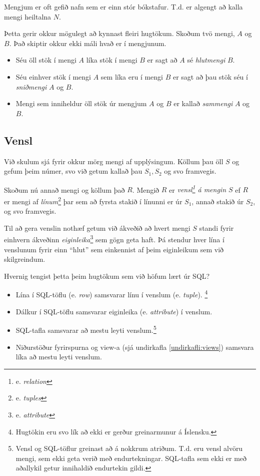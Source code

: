 Mengjum er oft gefið nafn sem er einn stór bókstafur. T.d. er algengt að kalla mengi heiltalna $N$. 

Þetta gerir okkur mögulegt að kynnast fleiri hugtökum. Skoðum tvö mengi, $A$ og $B$. Það skiptir okkur ekki máli hvað er í mengjunum.
\begin{itemize}
 \item Séu öll stök í mengi $A$ líka stök í mengi $B$ er sagt að $A$ sé \emph{hlutmengi} $B$.
 \item Séu einhver stök í mengi $A$ sem líka eru í mengi $B$ er sagt að þau stök séu í \emph{sniðmengi} $A$ og $B$.
 \item Mengi sem inniheldur öll stök úr mengjum $A$ og $B$ er kallað \emph{sammengi} $A$ og $B$.
\end{itemize}


\subsection{Vensl}
Við skulum sjá fyrir okkur mörg mengi af upplýsingum. Köllum þau öll $S$ og gefum þeim númer, svo við getum kallað þau $S_1, S_2$ og svo framvegis.

Skoðum nú annað mengi og köllum það $R$. Mengið $R$ er \emph{vensl\footnote{e. \emph{relation}} á mengin $S$} ef $R$ er mengi af \emph{línum}\footnote{e. \emph{tuples}} þar sem að fyrsta stakið í línunni er úr $S_1$, annað stakið úr $S_2$, og svo framvegis.

Til að gera venslin nothæf getum við ákveðið að hvert mengi $S$ standi fyrir einhvern ákveðinn \emph{eiginleika}\footnote{e. \emph{attribute}} sem gögn geta haft. Þá stendur hver lína í venslunum fyrir einn ``hlut'' sem einkennist af þeim eiginleikum sem við skilgreindum.

Hvernig tengist þetta þeim hugtökum sem við höfum lært úr SQL?

\begin{itemize}
 \item Lína í SQL-töflu (e. \emph{row}) samsvarar línu í venslum (e. \emph{tuple}). \footnote{Hugtökin eru svo lík að ekki er gerður greinarmunur á Íslensku.}
 \item Dálkur í SQL-töflu samsvarar eiginleika (e. \emph{attribute}) í venslum.
 \item SQL-tafla samsvarar að mestu leyti venslum.\footnote{Vensl og SQL-töflur greinast að á nokkrum atriðum. T.d. eru vensl alvöru mengi, sem ekki geta verið með endurtekningar. SQL-tafla sem ekki er með aðallykil getur innihaldið endurtekin gildi.}
 \item Niðurstöður fyrirspurna og view-a (sjá undirkafla \ref{undirkafli:views}) samsvara líka að mestu leyti venslum.
\end{itemize}

